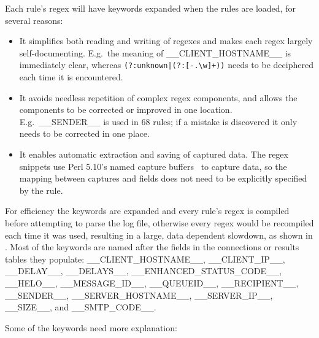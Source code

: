 \label{regex components}

Each rule's regex will have keywords expanded when the rules are loaded,
for several reasons:

\begin{itemize}

    \item It simplifies both reading and writing of regexes and makes each
        regex largely self-documenting.  E.g.\ the meaning of
        \_\_CLIENT\_HOSTNAME\_\_ is immediately clear, whereas
        \verb!(?:unknown|(?:[-.\w]+))! needs to be deciphered each time it
        is encountered.

    \item It avoids needless repetition of complex regex components, and
        allows the components to be corrected or improved in one location.
        E.g.\ \_\_SENDER\_\_ is used in 68 rules; if a mistake is
        discovered it only needs to be corrected in one place.

    \item It enables automatic extraction and saving of captured data.  The
        regex snippets use Perl 5.10's named capture buffers~\cite{perlre}
        to capture data, so the mapping between captures and fields does
        not need to be explicitly specified by the rule.

\end{itemize}

For efficiency the keywords are expanded and every rule's regex is compiled
before attempting to parse the log file, otherwise every regex would be
recompiled each time it was used, resulting in a large, data dependent
slowdown, as shown in .  Most of the
keywords are named after the fields in the connections or results tables
they populate: \_\_CLIENT\_HOSTNAME\_\_, \_\_CLIENT\_IP\_\_, \_\_DELAY\_\_,
\_\_DELAYS\_\_, \_\_ENHANCED\_STATUS\_CODE\_\_, \_\_HELO\_\_,
\_\_MESSAGE\_ID\_\_, \_\_QUEUEID\_\_, \_\_RECIPIENT\_\_, \_\_SENDER\_\_,
\_\_SERVER\_HOSTNAME\_\_, \_\_SERVER\_IP\_\_, \_\_SIZE\_\_, and
\_\_SMTP\_CODE\_\_.

Some of the keywords need more explanation:


